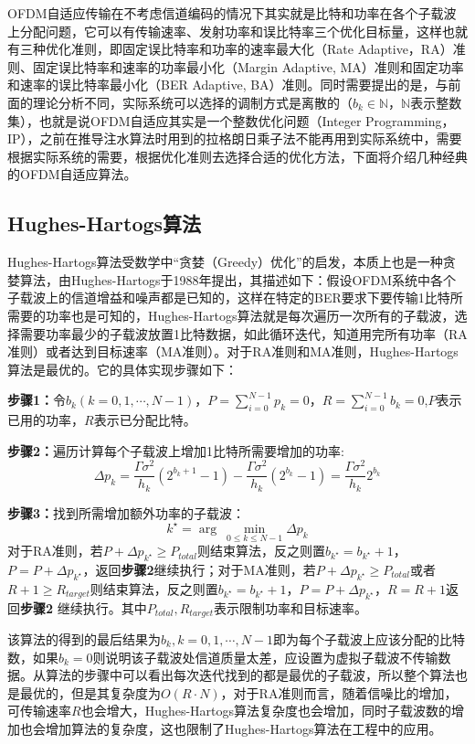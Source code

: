 OFDM自适应传输在不考虑信道编码的情况下其实就是比特和功率在各个子载波上分配问题，它可以有传输速率、发射功率和误比特率三个优化目标量，这样也就有三种优化准则，即固定误比特率和功率的速率最大化（Rate Adaptive，RA）准则、固定误比特率和速率的功率最小化（Margin Adaptive, MA）准则和固定功率和速率的误比特率最小化（BER Adaptive, BA）准则。同时需要提出的是，与前面的理论分析不同，实际系统可以选择的调制方式是离散的（$b_k \in \mathbb{N}$，$\mathbb{N}$表示整数集），也就是说OFDM自适应其实是一个整数优化问题（Integer Programming，IP），之前在推导注水算法时用到的拉格朗日乘子法不能再用到实际系统中，需要根据实际系统的需要，根据优化准则去选择合适的优化方法，下面将介绍几种经典的OFDM自适应算法。
\subsection{Hughes-Hartogs算法}
Hughes-Hartogs算\cite{hughes1989ensemble}法受数学中“贪婪（Greedy）优化”的启发，本质上也是一种贪婪算法，由Hughes-Hartogs于1988年提出，其描述如下：假设OFDM系统中各个子载波上的信道增益和噪声都是已知的，这样在特定的BER要求下要传输1比特所需要的功率也是可知的，Hughes-Hartogs算法就是每次遍历一次所有的子载波，选择需要功率最少的子载波放置1比特数据，如此循环迭代，知道用完所有功率（RA准则）或者达到目标速率（MA准则）。对于RA准则和MA准则，Hughes-Hartogs算法是最优的。它的具体实现步骤如下：
\begin{description}
\item{\bf{步骤1：}}令$b_k(k=0,1,\cdots,N-1)$，$P=\sum_{i=0}^{N-1}p_k=0$，$R=\sum_{i=0}^{N-1}b_k=0$,$P$表示已用的功率，$R$表示已分配比特。
\item{\bf{步骤2：}}遍历计算每个子载波上增加1比特所需要增加的功率:
\begin{equation}
\Delta p_k=\frac{\Gamma\sigma^2}{h_k}(2^{b_k+1}-1)-\frac{\Gamma\sigma^2}{h_k}(2^{b_k}-1)=\frac{\Gamma\sigma^2}{h_k}2^{b_k}
\end{equation}
\item{\bf{步骤3：}}找到所需增加额外功率的子载波：
\begin{equation}
k^{\star} = \arg\ \underset{0\leq k \leq N-1}{\min}\Delta p_k
\end{equation}
对于RA准则，若$P+\Delta p_{k^\star}\geq P_{total}$则结束算法，反之则置$b_{k^\star}=b_{k^\star}+1$，$P=P+\Delta p_{k^\star}$，返回\textbf{步骤2}继续执行；对于MA准则，若$P+\Delta p_{k^\star}\geq P_{total}$或者$R+1\geq R_{target}$则结束算法，反之则置$b_{k^\star}=b_{k^\star}+1$，$P=P+\Delta p_{k^\star}$，$R=R+1$返回\textbf{步骤2} 继续执行。其中$P_{total}, R_{target}$表示限制功率和目标速率。
\end{description}
该算法的得到的最后结果为$b_k, k=0,1,\cdots,N-1$即为每个子载波上应该分配的比特数，如果$b_k=0$则说明该子载波处信道质量太差，应设置为虚拟子载波不传输数据。从算法的步骤中可以看出每次迭代找到的都是最优的子载波，所以整个算法也是最优的，但是其复杂度为$O(R\cdot N)$，对于RA准则而言，随着信噪比的增加，可传输速率$R$也会增大，Hughes-Hartogs算法复杂度也会增加，同时子载波数的增加也会增加算法的复杂度，这也限制了Hughes-Hartogs算法在工程中的应用。
